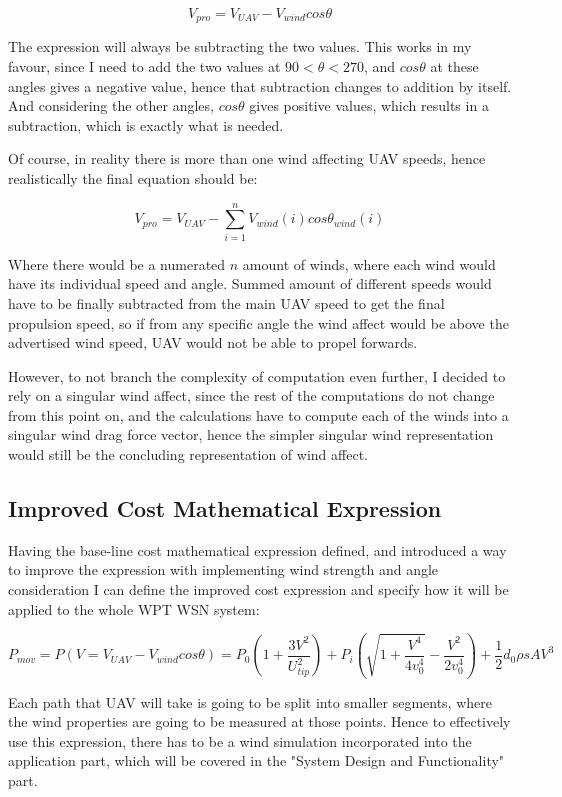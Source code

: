 \documentclass[11pt,a4paper,footinclude=true,headinclude=true, oneside]{scrbook}
\begin{document}
\[V_{pro} = V_{UAV} - V_{wind} cos \theta \]

The expression will always be subtracting the two values. This works in my favour, since I need to add the two values at \(90 < \theta < 270\), and \(cos\theta\) at these angles gives a negative value, hence that subtraction changes to addition by itself. And considering the other angles, \(cos\theta\) gives positive values, which results in a subtraction, which is exactly what is needed.

Of course, in reality there is more than one wind affecting UAV speeds, hence realistically the final equation should be:

\[V_{pro} = V_{UAV} - \sum_{i=1}^{n}V_{wind}(i) cos\theta_{wind}(i)\]

Where there would be a numerated \(n\) amount of winds, where each wind would have its individual speed and angle. Summed amount of different speeds would have to be finally subtracted from the main UAV speed to get the final propulsion speed, so if from any specific angle the wind affect would be above the advertised wind speed, UAV would not be able to propel forwards.

However, to not branch the complexity of computation even further, I decided to rely on a singular wind affect, since the rest of the computations do not change from this point on, and the calculations have to compute each of the winds into a singular wind drag force vector, hence the simpler singular wind representation would still be the concluding representation of wind affect.

\subsection{Improved Cost Mathematical Expression}

Having the base-line cost mathematical expression defined, and introduced a way to improve the expression with implementing wind strength and angle consideration I can define the improved cost expression and specify how it will be applied to the whole WPT WSN system:

\[ P_{mov} = P(V = V_{UAV} - V_{wind} cos \theta) = P_0  \left( 1 + \frac{3V^2}{U_{tip}^2} \right) 
    + P_i \left( \sqrt{1 + \frac{V^4}{4v_0^4}} - \frac{V^2}{2v_0^4} \right)
    + \frac{1}{2} d_0\rho sAV^3 \]

Each path that UAV will take is going to be split into smaller segments, where the wind properties are going to be measured at those points. Hence to effectively use this expression, there has to be a wind simulation incorporated into the application part, which will be covered in the "System Design and Functionality" part.
\end{document}
